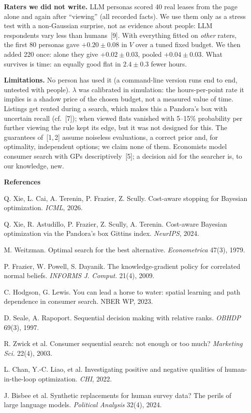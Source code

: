 \documentclass[10pt,a4paper,twocolumn]{article}
\newcommand{\lead}[1]{\textbf{#1}}
\begin{document}
\lead{Raters we did not write.} LLM personas scored 40 real leases from the page alone and again after
``viewing'' (all recorded facts). We use them only as a stress test with a non-Gaussian surprise, not as
evidence about people: LLM respondents vary less than humans~[9]. With everything fitted on \emph{other}
raters, the first 80 personas gave $+0.20\pm0.08$ in $V$ over a tuned fixed budget. We then added 220 once:
alone they give $+0.02\pm0.03$, pooled $+0.04\pm0.03$. What survives is time: an equally good flat in
$2.4\pm0.3$ fewer hours.

\lead{Limitations.} No person has used it (a command-line version runs end to end, untested with people). $\lambda$ was calibrated in simulation: the hours-per-point rate it implies is a shadow price of the
chosen budget, not a measured value of time. Listings get rented during a search, which makes this a
Pandora's box with uncertain recall (cf.~[7]); when viewed flats vanished with 5--15\% probability per further
viewing the rule kept its edge, but it was not designed for this. The guarantees of~[1,\,2] assume noiseless
evaluations, a correct prior and, for optimality, independent options; we claim none of them. Economists
model consumer search with GPs descriptively~[5]; a decision aid for the searcher is, to our knowledge, new.

\vspace{1pt}
{\scriptsize\setlength{\parskip}{0.6pt}
\lead{References}\par
[1] Q. Xie, L. Cai, A. Terenin, P. Frazier, Z. Scully. Cost-aware stopping for Bayesian optimization. \emph{ICML}, 2026.\par
[2] Q. Xie, R. Astudillo, P. Frazier, Z. Scully, A. Terenin. Cost-aware Bayesian optimization via the Pandora's box Gittins index. \emph{NeurIPS}, 2024.\par
[3] M. Weitzman. Optimal search for the best alternative. \emph{Econometrica} 47(3), 1979.\par
[4] P. Frazier, W. Powell, S. Dayanik. The knowledge-gradient policy for correlated normal beliefs. \emph{INFORMS J. Comput.} 21(4), 2009.\par
[5] C. Hodgson, G. Lewis. You can lead a horse to water: spatial learning and path dependence in consumer search. NBER WP, 2023.\par
[6] D. Seale, A. Rapoport. Sequential decision making with relative ranks. \emph{OBHDP} 69(3), 1997.\par
[7] R. Zwick et al. Consumer sequential search: not enough or too much? \emph{Marketing Sci.} 22(4), 2003.\par
[8] L. Chan, Y.-C. Liao, et al. Investigating positive and negative qualities of human-in-the-loop optimization. \emph{CHI}, 2022.\par
[9] J. Bisbee et al. Synthetic replacements for human survey data? The perils of large language models. \emph{Political Analysis} 32(4), 2024.\par
}
\end{document}
